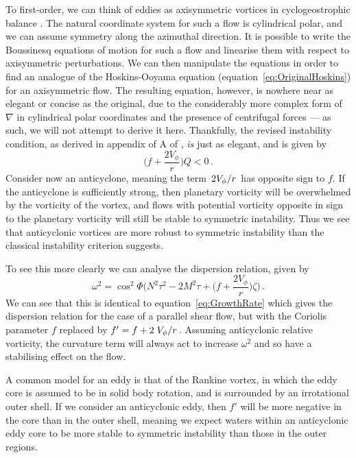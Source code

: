 To first-order, we can think of eddies as axisymmetric vortices in cyclogeostrophic balance \citep{Castelao2011, Cruz-Gomez2013}. The natural coordinate system for such a flow is cylindrical polar, and we can assume symmetry along the azimuthal direction. It is possible to write the Boussinesq equations of motion for such a flow and linearise them with respect to axisymmetric perturbations. We can then manipulate the equations in order to find an analogue of the Hoskins-Ooyama equation (equation~\ref{eq:OriginalHoskins}) for an axisymmetric flow. The resulting equation, however, is nowhere near as elegant or concise as the original, due to the considerably more complex form of $\nabla$ in cylindrical polar coordinates and the presence of centrifugal forces --- as such, we will not attempt to derive it here. Thankfully, the revised instability condition, as derived in appendix of A of \citet{Buckingham2021}, \textit{is} just as elegant, and is given by
\begin{equation}
    \bigg(f + \frac{2 V_\phi}{r}\bigg)Q < 0 \, .
\end{equation}
Consider now an anticyclone, meaning the term $\flatfrac{2V_\phi}{r}$ has opposite sign to $f$. If the anticyclone is sufficiently strong, then planetary vorticity will be overwhelmed by the vorticity of the vortex, and flows with potential vorticity opposite in sign to the planetary vorticity will still be stable to symmetric instability. Thus we see that anticyclonic vortices are more robust to symmetric instability than the classical instability criterion suggests.

To see this more clearly we can analyse the dispersion relation, given by
\begin{equation}
    \label{eq:GrowthRateCurv}
    \omega^2 = \cos^2\Phi \Bigg(N^2 \tau^2 - 2M^2\tau + \bigg(f + \frac{2V_\phi}{r}\bigg)\zeta\Bigg) \, .
\end{equation}
We can see that this is identical to equation~\ref{eq:GrowthRate} which gives the dispersion relation for the case of a parallel shear flow, but with the Coriolis parameter $f$ replaced by $f' = f + 2 \flatfrac{V_\phi}{r}$. Assuming anticyclonic relative vorticity, the curvature term will always act to increase $\omega^2$ and so have a stabilising effect on the flow.

A common model for an eddy is that of the Rankine vortex, in which the eddy core is assumed to be in solid body rotation, and is surrounded by an irrotational outer shell. If we consider an anticyclonic eddy, then $f'$ will be more negative in the core than in the outer shell, meaning we expect waters within an anticyclonic eddy core to be more stable to symmetric instability than those in the outer regions.

